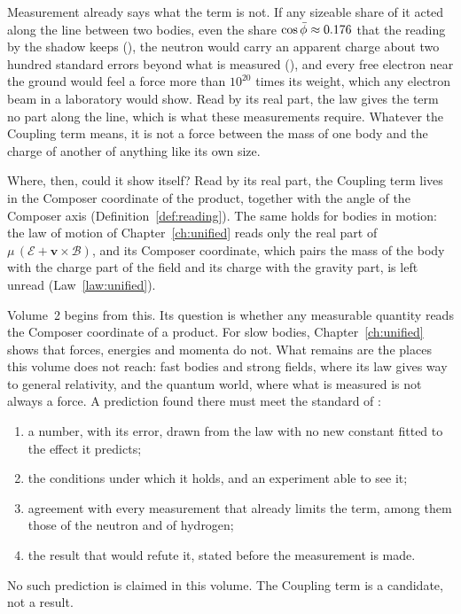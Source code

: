 Measurement already says what the term is not. If any sizeable share of it acted along the line between two bodies, even the share $\cos\bar{\phi} \approx 0.176$ that the reading by the shadow keeps (), the neutron would carry an apparent charge about two hundred standard errors beyond what is measured (), and every free electron near the ground would feel a force more than $10^{20}$ times its weight, which any electron beam in a laboratory would show. Read by its real part, the law gives the term no part along the line, which is what these measurements require. Whatever the Coupling term means, it is not a force between the mass of one body and the charge of another of anything like its own size.

Where, then, could it show itself? Read by its real part, the Coupling term lives in the Composer coordinate of the product, together with the angle of the Composer axis (Definition~\ref{def:reading}). The same holds for bodies in motion: the law of motion of Chapter~\ref{ch:unified} reads only the real part of $\mu\,(\boldsymbol{\mathcal{E}} + \mathbf{v}\times\boldsymbol{\mathcal{B}})$, and its Composer coordinate, which pairs the mass of the body with the charge part of the field and its charge with the gravity part, is left unread (Law~\ref{law:unified}).

Volume~2 begins from this. Its question is whether any measurable quantity reads the Composer coordinate of a product. For slow bodies, Chapter~\ref{ch:unified} shows that forces, energies and momenta do not. What remains are the places this volume does not reach: fast bodies and strong fields, where its law gives way to general relativity, and the quantum world, where what is measured is not always a force. A prediction found there must meet the standard of :
\begin{enumerate}
  \item a number, with its error, drawn from the law with no new constant fitted to the effect it predicts;
  \item the conditions under which it holds, and an experiment able to see it;
  \item agreement with every measurement that already limits the term, among them those of the neutron and of hydrogen;
  \item the result that would refute it, stated before the measurement is made.
\end{enumerate}
No such prediction is claimed in this volume. The Coupling term is a candidate, not a result.

